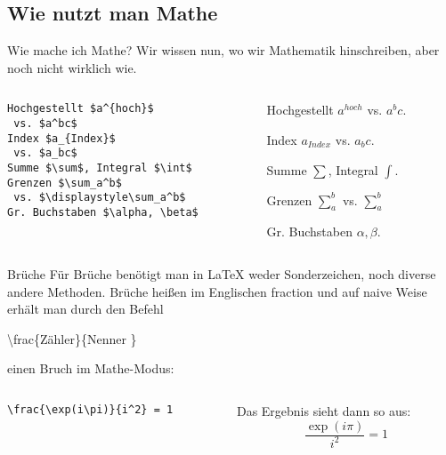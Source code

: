 \subsection{Wie nutzt man Mathe}

\begin{frame}[fragile]{Wie mache ich Mathe?}
Wir wissen nun, wo wir Mathematik hinschreiben, aber noch nicht wirklich wie.
\begin{columns}
\begin{column}{0.55\textwidth}
\begin{codeblock}
\begin{verbatim}
Hochgestellt $a^{hoch}$ 
 vs. $a^bc$
Index $a_{Index}$ 
 vs. $a_bc$
Summe $\sum$, Integral $\int$
Grenzen $\sum_a^b$ 
 vs. $\displaystyle\sum_a^b$
Gr. Buchstaben $\alpha, \beta$
\end{verbatim}
\end{codeblock}
\end{column}
\pause
\begin{column}{0.4\textwidth}
Hochgestellt $a^{hoch}$ vs. $a^bc$. 

\medskip\pause
Index $a_{Index}$ vs. $a_bc$.

\medskip\pause
Summe $\sum$, Integral $\int$.

\medskip\pause
Grenzen $\sum_a^b$ vs. $\displaystyle \sum_a^b$

\medskip\pause
Gr. Buchstaben $\alpha, \beta$.
\end{column}
\end{columns}
\end{frame}

\begin{frame}[fragile]{Brüche}
Für Brüche benötigt man in \LaTeX{} weder Sonderzeichen, noch diverse andere Methoden. Brüche heißen im Englischen \glqq fraction\grqq{} und auf naive Weise erhält man durch den Befehl
\begin{center}
\textrm{\textbackslash frac\{\textlangle Zähler\textrangle\}\{\textlangle Nenner \textrangle\}}
\end{center}
einen Bruch im Mathe-Modus:
\begin{columns}
\begin{column}{0.55\textwidth}
\begin{codeblock}
\begin{verbatim}
\frac{\exp(i\pi)}{i^2} = 1
\end{verbatim}
\end{codeblock}
\end{column}
\begin{column}{0.35\textwidth}
Das Ergebnis sieht dann so aus:
\[
    \frac{\exp(i\pi)}{i^2} = 1
\]
\end{column}
\end{columns}
\end{frame}

